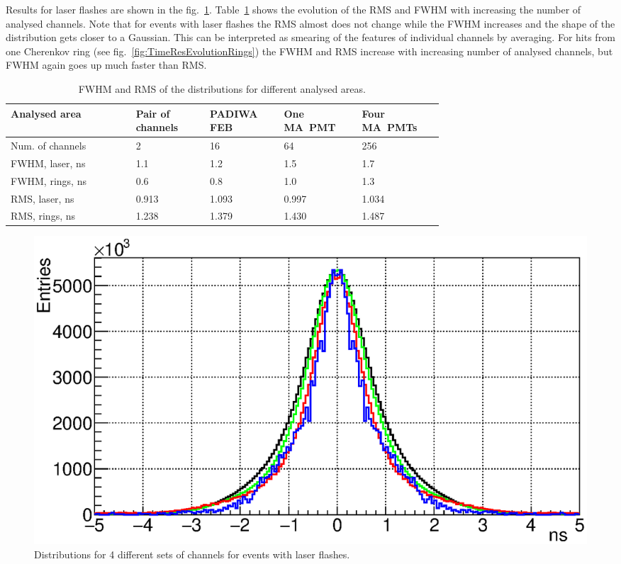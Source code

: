 \documentclass{JACoW-GSI-2015}
\begin{document}
Results for laser flashes are shown in the fig.~\ref{fig:TimeResEvolutionLaser}. Table~\ref{tabl:EvolutionParams} shows the evolution of the RMS and FWHM with increasing the number of analysed channels. Note that for events with laser flashes the RMS almost does not change while the FWHM increases and the shape of the distribution gets closer to a Gaussian. This can be interpreted as smearing of the features of individual channels by averaging. For hits from one Cherenkov ring (see fig.~\ref{fig:TimeResEvolutionRings}) the FWHM and RMS increase with increasing number of analysed channels, but FWHM again goes up much faster than RMS.

\begin{table}[tbh]
\caption{FWHM and RMS of the distributions for different analysed areas.}
\label{tabl:EvolutionParams}
\begin{tabular}{ | p{0.22\linewidth} | p{0.13\linewidth} | p{0.12\linewidth} | p{0.12\linewidth} | p{0.12\linewidth} | }
	\hline
	\scriptsize{Analysed area} & \scriptsize{Pair of channels} & \scriptsize{PADIWA FEB} & \scriptsize{One MA~PMT} & \scriptsize{Four MA~PMTs} \\
	\hline
	\scriptsize{Num. of channels} & 2 & 16 & 64 & 256 \\
	\hline
	\scriptsize{FWHM, laser, ns} & 1.1 & 1.2 & 1.5 & 1.7 \\
	\hline
	\scriptsize{FWHM, rings, ns} & 0.6 & 0.8 & 1.0 & 1.3 \\
	\hline
	\scriptsize{RMS, laser, ns} & 0.913 & 1.093 & 0.997 & 1.034 \\
	\hline
	\scriptsize{RMS, rings, ns} & 1.238 & 1.379 & 1.430 & 1.487 \\
	\hline
\end{tabular}
\end{table}

\begin{figure}[tbh]
\includegraphics[width=0.8\linewidth]{../PTE/pictures/24_TimePrecision_evolution_laser_feb2017.eps}
\caption{Distributions for 4 different sets of channels for events with laser flashes.}
\label{fig:TimeResEvolutionLaser}
\end{figure}
\end{document}
